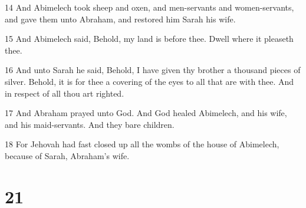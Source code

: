\par 14 And Abimelech took sheep and oxen, and men-servants and women-servants, and gave them unto Abraham, and restored him Sarah his wife.
\par 15 And Abimelech said, Behold, my land is before thee. Dwell where it pleaseth thee.
\par 16 And unto Sarah he said, Behold, I have given thy brother a thousand pieces of silver. Behold, it is for thee a covering of the eyes to all that are with thee. And in respect of all thou art righted.
\par 17 And Abraham prayed unto God. And God healed Abimelech, and his wife, and his maid-servants. And they bare children.
\par 18 For Jehovah had fast closed up all the wombs of the house of Abimelech, because of Sarah, Abraham's wife.

\chapter{21}


